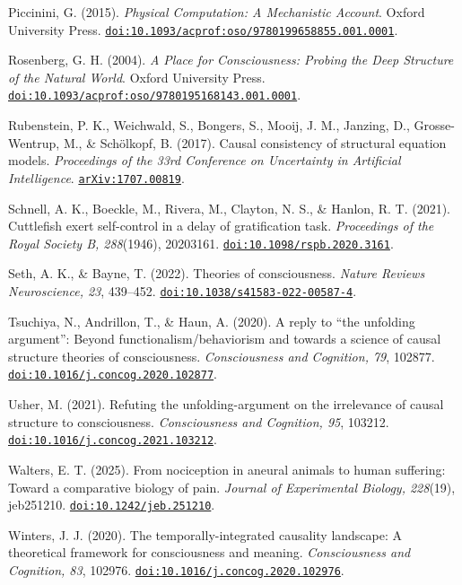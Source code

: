 \documentclass[
  11pt,
  a4paper,
]{article}
\begin{document}
Piccinini, G. (2015). \emph{Physical Computation: A Mechanistic
Account}. Oxford University Press.
\href{https://doi.org/10.1093/acprof:oso/9780199658855.001.0001}{\nolinkurl{doi:10.1093/acprof:oso/9780199658855.001.0001}}.

Rosenberg, G. H. (2004). \emph{A Place for Consciousness: Probing the
Deep Structure of the Natural World}. Oxford University Press.
\href{https://doi.org/10.1093/acprof:oso/9780195168143.001.0001}{\nolinkurl{doi:10.1093/acprof:oso/9780195168143.001.0001}}.

Rubenstein, P. K., Weichwald, S., Bongers, S., Mooij, J. M., Janzing,
D., Grosse-Wentrup, M., \& Schölkopf, B. (2017). Causal consistency of
structural equation models. \emph{Proceedings of the 33rd Conference on
Uncertainty in Artificial Intelligence}.
\href{https://arxiv.org/abs/1707.00819}{\nolinkurl{arXiv:1707.00819}}.

Schnell, A. K., Boeckle, M., Rivera, M., Clayton, N. S., \& Hanlon, R.
T. (2021). Cuttlefish exert self-control in a delay of gratification
task. \emph{Proceedings of the Royal Society B, 288}(1946), 20203161.
\href{https://doi.org/10.1098/rspb.2020.3161}{\nolinkurl{doi:10.1098/rspb.2020.3161}}.

Seth, A. K., \& Bayne, T. (2022). Theories of consciousness.
\emph{Nature Reviews Neuroscience, 23}, 439--452.
\href{https://doi.org/10.1038/s41583-022-00587-4}{\nolinkurl{doi:10.1038/s41583-022-00587-4}}.

Tsuchiya, N., Andrillon, T., \& Haun, A. (2020). A reply to ``the
unfolding argument'': Beyond functionalism/behaviorism and towards a
science of causal structure theories of consciousness.
\emph{Consciousness and Cognition, 79}, 102877.
\href{https://doi.org/10.1016/j.concog.2020.102877}{\nolinkurl{doi:10.1016/j.concog.2020.102877}}.

Usher, M. (2021). Refuting the unfolding-argument on the irrelevance of
causal structure to consciousness. \emph{Consciousness and Cognition,
95}, 103212.
\href{https://doi.org/10.1016/j.concog.2021.103212}{\nolinkurl{doi:10.1016/j.concog.2021.103212}}.

Walters, E. T. (2025). From nociception in aneural animals to human
suffering: Toward a comparative biology of pain. \emph{Journal of
Experimental Biology, 228}(19), jeb251210.
\href{https://doi.org/10.1242/jeb.251210}{\nolinkurl{doi:10.1242/jeb.251210}}.

Winters, J. J. (2020). The temporally-integrated causality landscape: A
theoretical framework for consciousness and meaning. \emph{Consciousness
and Cognition, 83}, 102976.
\href{https://doi.org/10.1016/j.concog.2020.102976}{\nolinkurl{doi:10.1016/j.concog.2020.102976}}.
\end{document}
